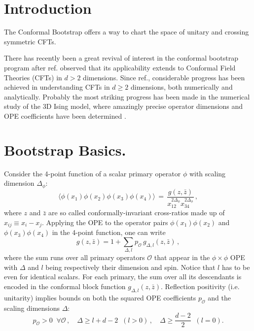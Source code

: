 \documentclass[letterpaper]{article}
\numberwithin{equation}{section}
\begin{document}
\maketitle

\section{Introduction}
The Conformal Bootstrap offers a way to chart the space of unitary and crossing
symmetric CFTs. 

There has recently been a great revival of interest in the conformal bootstrap program \cite{Ferrara:1973yt,Polyakov:1974gs} after ref.\cite{Rattazzi:2008pe} observed that 
its applicability extends to Conformal Field Theories (CFTs) in $d>2$ dimensions. 
Since ref.\cite{Rattazzi:2008pe}, considerable progress has been achieved in understanding CFTs in $d\geq 2$ dimensions, both numerically and analytically.
Probably the most striking progress has been made in the numerical study of the 3D Ising model,
where amazingly precise operator dimensions and OPE coefficients have been determined
\cite{ElShowk:2012ht,El-Showk:2014dwa,Kos:2016ysd}.


\section{Bootstrap Basics.}
Consider the 4-point function of a scalar primary operator $\phi$ with scaling dimension $\Delta_\phi$: 
\begin{equation}
\label{4-point-function}
\langle \phi(x_1) \phi(x_2) \phi(x_3) \phi(x_4) \rangle \, = \, \frac{g(z,\bar z)}{x_{12}^{2\Delta_\phi}x_{34}^{2\Delta_\phi} } \,,
\end{equation}
where $z$ and $\bar z$ are so called conformally-invariant cross-ratios made up of $x_{ij}\equiv x_i-x_j$.
Applying the OPE to the operator pairs $\phi(x_1) \phi(x_2)$ and $\phi(x_3) \phi(x_4)$ in the 4-point function, one can write
\begin{equation}
g(z,\bar z) = 1+\sum_{\Delta ,l } p_{\mathcal{O}} \, g_{\Delta,l}(z,\bar z) \,, 
\label{CBExp}
 \end{equation}
where the sum runs over all primary operators $\mathcal{O}$ that appear in the $\phi\times \phi$ OPE with  $\Delta$ and $l$ being respectively their dimension and spin. Notice that $l$ has to be even
for identical scalars. For each primary, the sum over all its descendants is encoded in the conformal block function $g_{\Delta,l}(z,\bar z)$. Reflection positivity (i.e. unitarity) implies bounds on both the squared OPE coefficients $p_{\mathcal{O}}$
and the scaling dimensions $\Delta$:
\begin{equation}
p_{\mathcal{O}} >0 \;\; \forall \mathcal{O}\,,  \quad
 \Delta \geq l+d-2 \;\; (l>0)\,, \quad \Delta \geq \frac{d-2}2 \;\; (l=0).
  \label{unit-bound}
\end{equation}
\end{document}
